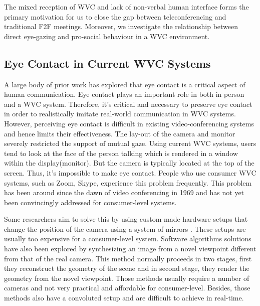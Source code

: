 The mixed reception of WVC and lack of non-verbal human interface forms the primary motivation for us to close the gap between teleconferencing and traditional F2F meetings. Moreover, we investigate the relationship between direct eye-gazing and pro-social behaviour in a WVC environment.


\subsection{Eye Contact in Current WVC Systems}

A large body of prior work has explored that eye contact is a critical aspect of human communication. \cite{article, 10.1145/503376.503386} Eye contact plays an important role in both in person and a WVC system. \cite{10.1145/1056808.1056995, 10.1145/937549.937552} Therefore, it’s critical and necessary to preserve eye contact in order to realistically imitate real-world communication in WVC systems. However, perceiving eye contact is difficult in existing video-conferencing systems and hence limits their effectiveness. \cite{10.1145/503376.503386} The lay-out of the camera and monitor severely restricted the support of mutual gaze. Using current WVC systems, users tend to look at the face of the person talking which is rendered in a window within the display(monitor). But the camera is typically located at the top of the screen. Thus, it’s impossible to make eye contact. People who use consumer WVC systems, such as Zoom, Skype, experience this problem frequently. This problem has been around since the dawn of video conferencing in 1969\cite{1090060} and has not yet been convincingly addressed for consumer-level systems. 

Some researchers aim to solve this by using custom-made hardware setups that change the position of the camera using a system of mirrors \cite{10.1145/192844.193054, 10.1145/142750.142977}. These setups are usually too expensive for a consumer-level system. Software algorithms solutions have also been explored by synthesizing an image from a novel viewpoint different from that of the real camera. This method normally proceeds in two stages, first they reconstruct the geometry of the scene and in second stage, they render the geometry from the novel viewpoint. \cite{10.1145/344779.344951, 10.1145/1015706.1015805, 10.1145/1186562.1015766, article9, a12} Those methods usually require a number of cameras and not very practical and affordable for consumer-level. Besides, those methods also have a convoluted setup and are difficult to achieve in real-time. 


